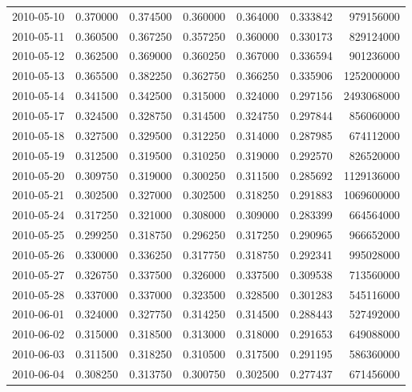 \begin{tabular}{lrrrrrr}
2010-05-10 &    0.370000 &    0.374500 &    0.360000 &    0.364000 &    0.333842 &   979156000 \\
2010-05-11 &    0.360500 &    0.367250 &    0.357250 &    0.360000 &    0.330173 &   829124000 \\
2010-05-12 &    0.362500 &    0.369000 &    0.360250 &    0.367000 &    0.336594 &   901236000 \\
2010-05-13 &    0.365500 &    0.382250 &    0.362750 &    0.366250 &    0.335906 &  1252000000 \\
2010-05-14 &    0.341500 &    0.342500 &    0.315000 &    0.324000 &    0.297156 &  2493068000 \\
2010-05-17 &    0.324500 &    0.328750 &    0.314500 &    0.324750 &    0.297844 &   856060000 \\
2010-05-18 &    0.327500 &    0.329500 &    0.312250 &    0.314000 &    0.287985 &   674112000 \\
2010-05-19 &    0.312500 &    0.319500 &    0.310250 &    0.319000 &    0.292570 &   826520000 \\
2010-05-20 &    0.309750 &    0.319000 &    0.300250 &    0.311500 &    0.285692 &  1129136000 \\
2010-05-21 &    0.302500 &    0.327000 &    0.302500 &    0.318250 &    0.291883 &  1069600000 \\
2010-05-24 &    0.317250 &    0.321000 &    0.308000 &    0.309000 &    0.283399 &   664564000 \\
2010-05-25 &    0.299250 &    0.318750 &    0.296250 &    0.317250 &    0.290965 &   966652000 \\
2010-05-26 &    0.330000 &    0.336250 &    0.317750 &    0.318750 &    0.292341 &   995028000 \\
2010-05-27 &    0.326750 &    0.337500 &    0.326000 &    0.337500 &    0.309538 &   713560000 \\
2010-05-28 &    0.337000 &    0.337000 &    0.323500 &    0.328500 &    0.301283 &   545116000 \\
2010-06-01 &    0.324000 &    0.327750 &    0.314250 &    0.314500 &    0.288443 &   527492000 \\
2010-06-02 &    0.315000 &    0.318500 &    0.313000 &    0.318000 &    0.291653 &   649088000 \\
2010-06-03 &    0.311500 &    0.318250 &    0.310500 &    0.317500 &    0.291195 &   586360000 \\
2010-06-04 &    0.308250 &    0.313750 &    0.300750 &    0.302500 &    0.277437 &   671456000 \\

\end{tabular}
